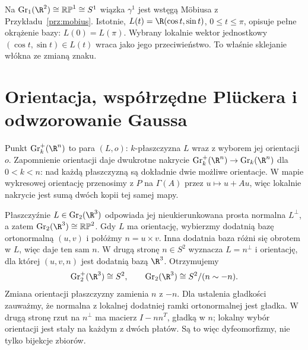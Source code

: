 \begin{przyklad}
Na $\operatorname{Gr}_1(\R^2)\cong\mathbb{RP}^1\cong S^1$
wiązka $\gamma^1$ jest wstęgą Möbiusa z
Przykładu~\ref{prz:mobius}. Istotnie,
$L(t)=\R(\cos t,\sin t)$, $0\leq t\leq\pi$,
opisuje pełne okrążenie bazy: $L(0)=L(\pi)$.
Wybrany lokalnie wektor jednostkowy
$(\cos t,\sin t)\in L(t)$ wraca jako jego
przeciwieństwo. To właśnie sklejanie włókna
ze zmianą znaku.
\end{przyklad}

\section{Orientacja, współrzędne Plückera i odwzorowanie Gaussa}
\label{sec:grass-plucker}

\begin{definicja}
Punkt $\operatorname{Gr}^+_k(\R^n)$ to para $(L,o)$:
$k$-płaszczyzna $L$ wraz z wyborem jej orientacji $o$.
Zapomnienie orientacji daje dwukrotne nakrycie
$\operatorname{Gr}^+_k(\R^n)\to\operatorname{Gr}_k(\R^n)$
dla $0<k<n$: nad każdą płaszczyzną są dokładnie
dwie możliwe orientacje. W mapie wykresowej
orientację przenosimy z $P$ na $\Gamma(A)$ przez
$u\mapsto u+Au$, więc lokalnie nakrycie jest
sumą dwóch kopii tej samej mapy.
\end{definicja}

\begin{przyklad}[Płaszczyzny w $\R^3$]
Płaszczyźnie $L\in\operatorname{Gr}_2(\R^3)$
odpowiada jej nieukierunkowana prosta normalna
$L^\perp$, a zatem
$\operatorname{Gr}_2(\R^3)\cong\mathbb{RP}^2$.
Gdy $L$ ma orientację, wybierzmy dodatnią bazę
ortonormalną $(u,v)$ i połóżmy $n=u\times v$.
Inna dodatnia baza różni się obrotem w $L$,
więc daje ten sam $n$. W drugą stronę $n\in S^2$
wyznacza $L=n^\perp$ i orientację, dla której
$(u,v,n)$ jest dodatnią bazą $\R^3$. Otrzymujemy
\[
 \operatorname{Gr}^+_2(\R^3)\cong S^2,\qquad
 \operatorname{Gr}_2(\R^3)\cong S^2/(n\sim -n).
\]
Zmiana orientacji płaszczyzny zamienia $n$ z $-n$.
Dla ustalenia gładkości zauważmy, że normalna z lokalnej dodatniej
ramki ortonormalnej jest gładka. W drugą stronę rzut
na $n^\perp$ ma macierz $I-nn^T$, gładką w $n$;
lokalny wybór orientacji jest stały na każdym z dwóch płatów.
Są to więc dyfeomorfizmy, nie tylko bijekcje zbiorów.
\end{przyklad}

